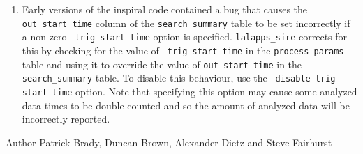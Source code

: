 \begin{entry}
\begin{enumerate}
\item Early versions of the inspiral code contained a bug that causes the
\verb$out_start_time$ column of the \verb$search_summary$ table to be set
incorrectly if a non-zero \texttt{--trig-start-time} option is specified.
\verb$lalapps_sire$ corrects for this by checking for the value of
\texttt{--trig-start-time} in the \verb$process_params$ table and using it to
override the value of \verb$out_start_time$ in the \verb$search_summary$
table. To disable this behaviour, use the \texttt{--disable-trig-start-time}
option. Note that specifying this option may cause some analyzed data times to
be double counted and so the amount of analyzed data will be incorrectly
reported.
\end{enumerate}

\item[Author] 
Patrick Brady, Duncan Brown, Alexander Dietz and Steve Fairhurst
\end{entry}


